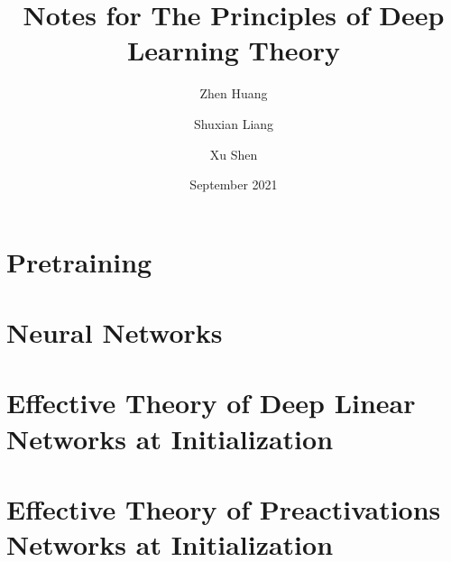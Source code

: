 \documentclass[12pt, letterpaper, twoside]{article}
\title{\textbf{Notes for The Principles of Deep Learning Theory}}
\author{Zhen Huang \and Shuxian Liang \and Xu Shen}
\date{September 2021}
\begin{document}
\begin{titlepage}
\maketitle
\end{titlepage}

\tableofcontents
\newpage

\section{Pretraining}
\label{sec:1}


\section{Neural Networks}
\label{sec:2}


\section{Effective Theory of Deep Linear Networks at Initialization}
\label{sec:3}


\section{Effective Theory of Preactivations Networks at Initialization}
\label{sec:5}

\end{document}
